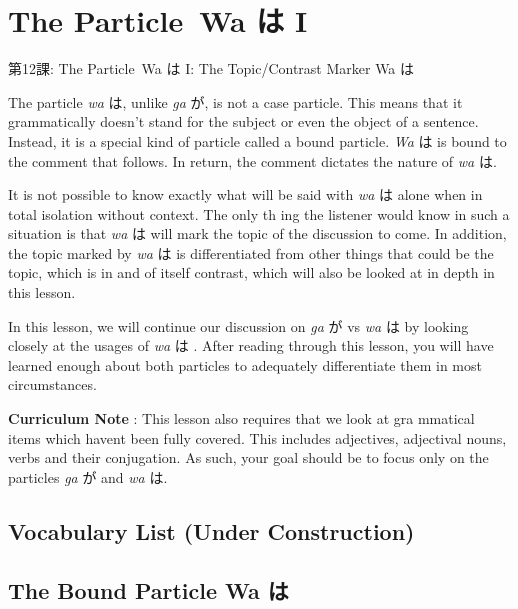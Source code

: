    
\chapter{The Particle Wa は I}

\begin{center}
\begin{Large}
第12課: The Particle Wa は I: The Topic\slash Contrast Marker Wa は 
\end{Large}
\end{center}
 
\par{  The particle \emph{wa }\emph{ }は, unlike \emph{ga }が, is not a case particle. This means that it grammatically doesn't stand for the subject or even the object of a sentence. Instead, it is a special kind of particle called a bound particle. \emph{Wa }は is bound to the comment that follows. In return, the comment dictates the nature of \emph{wa }は. }

\par{ It is not possible to know exactly what will be said with \emph{wa }は alone when in total isolation without context. The only th ing the listener would know in such a situation is that \emph{wa }は will mark the topic of the discussion to come. In addition, the topic marked by \emph{wa }は is differentiated from other things that could be the topic, which is in and of itself contrast, which will also be looked at in depth in this lesson. }

\par{ In this lesson, we will continue our discussion on \emph{ga }が vs \emph{wa }は by looking closely at the usages of \emph{wa }は . After reading through this lesson, you will have learned enough about both particles to adequately differentiate them in most circumstances. }

\par{\textbf{Curriculum Note }: This lesson also requires that we look at gra mmatical items which haven\textquotesingle t been fully covered. This includes adjectives, adjectival nouns, verbs and their conjugation. As such, your goal should be to focus only on the particles \emph{ga }が and \emph{wa }は.  }
      
\section{Vocabulary List (Under Construction)}
       
\section{The Bound Particle Wa は}
 
